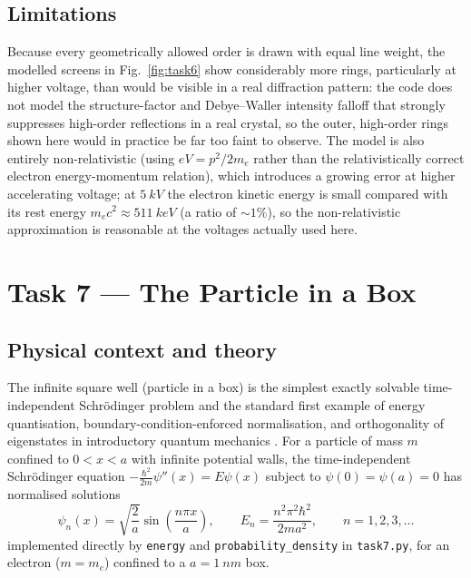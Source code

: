 \documentclass[11pt]{article}
\begin{document}
\subsection{Limitations}
Because every geometrically allowed order is drawn with equal line weight, the modelled screens in Fig.~\ref{fig:task6} show considerably more rings, particularly at higher voltage, than would be visible in a real diffraction pattern: the code does not model the structure-factor and Debye--Waller intensity falloff that strongly suppresses high-order reflections in a real crystal, so the outer, high-order rings shown here would in practice be far too faint to observe. The model is also entirely non-relativistic (using $eV=p^2/2m_e$ rather than the relativistically correct electron energy-momentum relation), which introduces a growing error at higher accelerating voltage; at $\SI{5}{kV}$ the electron kinetic energy is small compared with its rest energy $m_ec^2\approx\SI{511}{keV}$ (a ratio of $\sim1\%$), so the non-relativistic approximation is reasonable at the voltages actually used here.

\section{Task 7 --- The Particle in a Box}
\label{sec:task7}

\subsection{Physical context and theory}
The infinite square well (particle in a box) is the simplest exactly solvable time-independent Schr\"odinger problem and the standard first example of energy quantisation, boundary-condition-enforced normalisation, and orthogonality of eigenstates in introductory quantum mechanics \cite{griffiths}. For a particle of mass $m$ confined to $0<x<a$ with infinite potential walls, the time-independent Schr\"odinger equation $-\frac{\hbar^2}{2m}\psi''(x)=E\psi(x)$ subject to $\psi(0)=\psi(a)=0$ has normalised solutions
\begin{equation}
\psi_n(x) = \sqrt{\frac2a}\sin\!\left(\frac{n\pi x}{a}\right), \qquad E_n = \frac{n^2\pi^2\hbar^2}{2ma^2}, \qquad n=1,2,3,\ldots \label{eq:pib}
\end{equation}
implemented directly by \texttt{energy} and \texttt{probability\_density} in \texttt{task7.py}, for an electron ($m=m_e$) confined to a $a=\SI{1}{nm}$ box.
\end{document}
